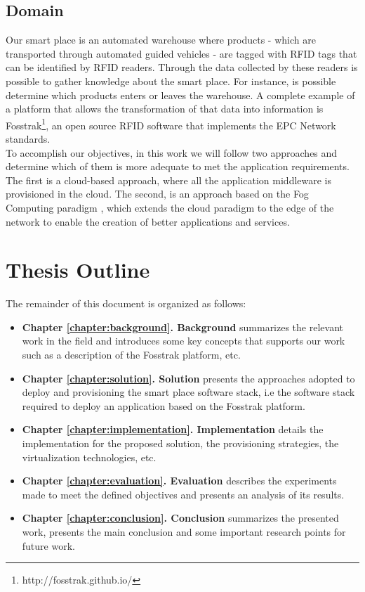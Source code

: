 \subsection{Domain}
\label{sub:domain}
Our smart place is an automated warehouse where products - which are transported through automated
guided vehicles - are tagged with \gls{RFID} tags that can be identified by \gls{RFID} readers.
Through the data collected by these readers is possible to gather knowledge about the smart place.
For instance, is possible determine which products enters or leaves the warehouse. A complete example
of a platform that allows the transformation of that data into information is Fosstrak\footnote{http://fosstrak.github.io/},
an open source \gls{RFID} software that implements the \gls{EPC} Network standards.\\

To accomplish our objectives, in this work we will follow two approaches and determine which of them
is more adequate to met the application requirements. The first is a cloud-based approach, where
all the application middleware is provisioned in the cloud. The second, is an approach based on the
Fog Computing paradigm \cite{bonomi2012fog}, which extends the cloud paradigm to the edge of the
network to enable the creation of better applications and services.

\section{Thesis Outline}
\label{section:outline}
The remainder of this document is organized as follows:
\begin{itemize}
  \item \textbf{Chapter \ref{chapter:background}. Background} summarizes the relevant work in the field and
  introduces some key concepts that supports our work such as a description of the Fosstrak platform, etc.
  \item \textbf{Chapter \ref{chapter:solution}. Solution} presents the approaches adopted to deploy
  and provisioning the smart place software stack, i.e the software stack required to deploy
  an application based on the Fosstrak platform.
  \item \textbf{Chapter \ref{chapter:implementation}. Implementation} details the implementation
  for the proposed solution, the provisioning strategies, the virtualization technologies, etc.
  \item \textbf{Chapter \ref{chapter:evaluation}. Evaluation} describes the experiments made to meet
  the defined objectives and presents an analysis of its results.
  \item \textbf{Chapter \ref{chapter:conclusion}. Conclusion} summarizes the presented work,
  presents the main conclusion and some important research points for future work.
\end{itemize}

